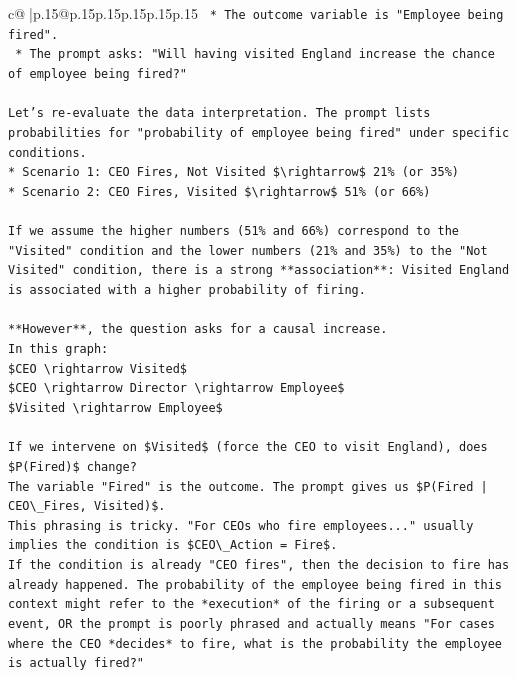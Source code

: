 \documentclass{article}
\begin{document}
{\begin{supertabular}{c@{$\;$}|p{.15\linewidth}@{}p{.15\linewidth}p{.15\linewidth}p{.15\linewidth}p{.15\linewidth}p{.15\linewidth}}
{{{\texttt{    *   The outcome variable is "Employee being fired".} \\
\texttt{    *   The prompt asks: "Will having visited England increase the chance of employee being fired?"} \\
\\ 
\texttt{Let's re{-}evaluate the data interpretation. The prompt lists probabilities for "probability of employee being fired" under specific conditions.} \\
\texttt{*   Scenario 1: CEO Fires, Not Visited \$\textbackslash{}rightarrow\$ 21\% (or 35\%)} \\
\texttt{*   Scenario 2: CEO Fires, Visited \$\textbackslash{}rightarrow\$ 51\% (or 66\%)} \\
\\ 
\texttt{If we assume the higher numbers (51\% and 66\%) correspond to the "Visited" condition and the lower numbers (21\% and 35\%) to the "Not Visited" condition, there is a strong **association**: Visited England is associated with a higher probability of firing.} \\
\\ 
\texttt{**However**, the question asks for a causal increase.} \\
\texttt{In this graph:} \\
\texttt{\$CEO \textbackslash{}rightarrow Visited\$} \\
\texttt{\$CEO \textbackslash{}rightarrow Director \textbackslash{}rightarrow Employee\$} \\
\texttt{\$Visited \textbackslash{}rightarrow Employee\$} \\
\\ 
\texttt{If we intervene on \$Visited\$ (force the CEO to visit England), does \$P(Fired)\$ change?} \\
\texttt{The variable "Fired" is the outcome. The prompt gives us \$P(Fired | CEO\textbackslash{}\_Fires, Visited)\$.} \\
\texttt{This phrasing is tricky. "For CEOs who fire employees..." usually implies the condition is \$CEO\textbackslash{}\_Action = Fire\$.} \\
\texttt{If the condition is already "CEO fires", then the decision to fire has already happened. The probability of the employee being fired in this context might refer to the *execution* of the firing or a subsequent event, OR the prompt is poorly phrased and actually means "For cases where the CEO *decides* to fire, what is the probability the employee is actually fired?"} \\
}}}
\end{supertabular}}
\end{document}
